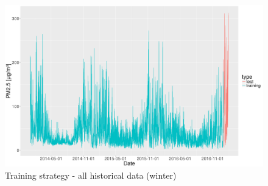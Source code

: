 \begin{figure}[H]
\centering
  \centering
  \includegraphics[width=0.95\linewidth]{figures/methodology/split/continuous_split_1.png}
  \caption{Training strategy - all historical data (winter)}
  \label{fig:methodology-training-all-data}
\end{figure}

